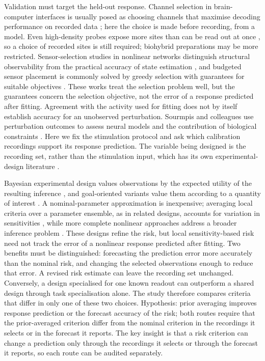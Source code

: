 Validation must target the held-out response. Channel selection in brain-computer interfaces is usually posed as choosing channels that maximise decoding performance on recorded data \cite{ref30}; here the choice is made before recording, from a model. Even high-density probes expose more sites than can be read out at once \cite{ref31}, so a choice of recorded sites is still required; biohybrid preparations may be more restricted. Sensor-selection studies in nonlinear networks distinguish structural observability from the practical accuracy of state estimation \cite{ref07}, and budgeted sensor placement is commonly solved by greedy selection with guarantees for suitable objectives \cite{ref25}. These works treat the selection problem well, but the guarantees concern the selection objective, not the error of a response predicted after fitting. Agreement with the activity used for fitting does not by itself establish accuracy for an unobserved perturbation. Sourmpis and colleagues use perturbation outcomes to assess neural models and the contribution of biological constraints \cite{ref08}. Here we fix the stimulation protocol and ask which calibration recordings support its response prediction. The variable being designed is the recording set, rather than the stimulation input, which has its own experimental-design literature \cite{ref09,ref32}.

Bayesian experimental design values observations by the expected utility of the resulting inference \cite{ref18,ref24}, and goal-oriented variants value them according to a quantity of interest \cite{ref10}. A nominal-parameter approximation is inexpensive; averaging local criteria over a parameter ensemble, as in related designs, accounts for variation in sensitivities \cite{ref21}, while more complete nonlinear approaches address a broader inference problem \cite{ref11,ref19,ref20,ref22}. These designs refine the risk, but local sensitivity-based risk need not track the error of a nonlinear response predicted after fitting. Two benefits must be distinguished: forecasting the prediction error more accurately than the nominal risk, and changing the selected observations enough to reduce that error. A revised risk estimate can leave the recording set unchanged. Conversely, a design specialised for one known readout can outperform a shared design through task specialisation alone. The study therefore compares criteria that differ in only one of these two choices. Hypothesis: prior averaging improves response prediction or the forecast accuracy of the risk; both routes require that the prior-averaged criterion differ from the nominal criterion in the recordings it selects or in the forecast it reports. The key insight is that a risk criterion can change a prediction only through the recordings it selects or through the forecast it reports, so each route can be audited separately.

